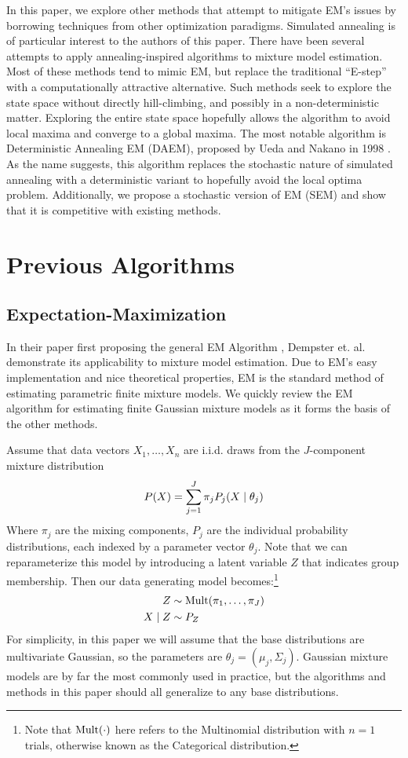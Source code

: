 \documentclass{article}
\newcommand*{\cond}{\;\ifnum\currentgrouptype=16 \middle\fi|\;}
\newcommand*{\mt}[1]{\text{\normalfont #1}}
\newcommand*{\dist}{\sim}
\theoremstyle{definition}
\theoremstyle{algodesc}
\begin{document}
In this paper, we explore other methods that attempt to mitigate EM's issues by borrowing techniques from other optimization paradigms. Simulated annealing \cite{kirkpatrickgelattvecchi83} is of particular interest to the authors of this paper. There have been several attempts to apply annealing-inspired algorithms to mixture model estimation. Most of these methods tend to mimic EM, but replace the traditional ``E-step'' with a computationally attractive alternative. Such methods seek to explore the state space without directly hill-climbing, and possibly in a non-deterministic matter. Exploring the entire state space hopefully allows the algorithm to avoid local maxima and converge to a global maxima. The most notable algorithm is Deterministic Annealing EM (DAEM), proposed by Ueda and Nakano in 1998 \cite{uedanakano98}. As the name suggests, this algorithm replaces the stochastic nature of simulated annealing with a deterministic variant to hopefully avoid the local optima problem. Additionally, we propose a stochastic version of EM (SEM) and show that it is competitive with existing methods.


\section{Previous Algorithms} \label{sec:algos}


\subsection{Expectation-Maximization}

In their paper first proposing the general EM Algorithm \cite{dempsterlairdrubin77}, Dempster et. al. demonstrate its applicability to mixture model estimation. Due to EM's easy implementation and nice theoretical properties, EM is the standard method of estimating parametric finite mixture models. We quickly review the EM algorithm for estimating finite Gaussian mixture models as it forms the basis of the other methods.

Assume that data vectors $X_1, \dots, X_n$ are i.i.d. draws from the $J$-component mixture distribution
\begin{equation*}
P(X) = \sum_{j=1}^J \pi_j P_j(X \cond \theta_j)
\end{equation*}
Where $\pi_j$ are the mixing components, $P_j$ are the individual probability distributions, each indexed by a parameter vector $\theta_j$. Note that we can reparameterize this model by introducing a latent variable $Z$ that indicates group membership. Then our data generating model becomes:\footnote{Note that $\mt{Mult}(\cdot)$ here refers to the Multinomial distribution with $n=1$ trials, otherwise known as the Categorical distribution.}
\begin{align*}
Z &\dist \mt{Mult}(\pi_1, \dots, \pi_J) \\
X \cond Z &\dist P_Z
\end{align*}
For simplicity, in this paper we will assume that the base distributions are multivariate Gaussian, so the parameters are $\theta_j = (\mu_j, \Sigma_j)$. Gaussian mixture models are by far the most commonly used in practice, but the algorithms and methods in this paper should all generalize to any base distributions.
\end{document}
